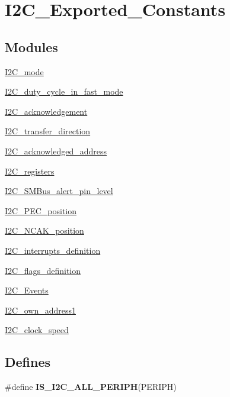 \hypertarget{group__I2C__Exported__Constants}{
\section{I2C\_\-Exported\_\-Constants}
\label{group__I2C__Exported__Constants}
}
\subsection*{Modules}
\begin{DoxyCompactItemize}
\item 
\hyperlink{group__I2C__mode}{I2C\_\-mode}
\item 
\hyperlink{group__I2C__duty__cycle__in__fast__mode}{I2C\_\-duty\_\-cycle\_\-in\_\-fast\_\-mode}
\item 
\hyperlink{group__I2C__acknowledgement}{I2C\_\-acknowledgement}
\item 
\hyperlink{group__I2C__transfer__direction}{I2C\_\-transfer\_\-direction}
\item 
\hyperlink{group__I2C__acknowledged__address}{I2C\_\-acknowledged\_\-address}
\item 
\hyperlink{group__I2C__registers}{I2C\_\-registers}
\item 
\hyperlink{group__I2C__SMBus__alert__pin__level}{I2C\_\-SMBus\_\-alert\_\-pin\_\-level}
\item 
\hyperlink{group__I2C__PEC__position}{I2C\_\-PEC\_\-position}
\item 
\hyperlink{group__I2C__NCAK__position}{I2C\_\-NCAK\_\-position}
\item 
\hyperlink{group__I2C__interrupts__definition}{I2C\_\-interrupts\_\-definition}
\item 
\hyperlink{group__I2C__flags__definition}{I2C\_\-flags\_\-definition}
\item 
\hyperlink{group__I2C__Events}{I2C\_\-Events}
\item 
\hyperlink{group__I2C__own__address1}{I2C\_\-own\_\-address1}
\item 
\hyperlink{group__I2C__clock__speed}{I2C\_\-clock\_\-speed}
\end{DoxyCompactItemize}
\subsection*{Defines}
\begin{DoxyCompactItemize}
\item 
\#define {\bfseries IS\_\-I2C\_\-ALL\_\-PERIPH}(PERIPH)
\end{DoxyCompactItemize}



